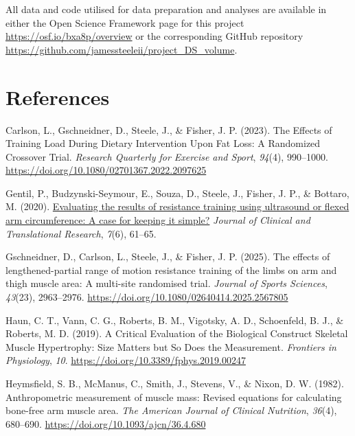 \documentclass[
]{article}
\newlength{\cslhangindent}
\newenvironment{CSLReferences}[2] %
 {\begin{list}{}{%
  \setlength{\itemindent}{0pt}
  \setlength{\leftmargin}{0pt}
  \setlength{\parsep}{0pt}
  \ifodd #1
   \setlength{\leftmargin}{\cslhangindent}
   \setlength{\itemindent}{-1\cslhangindent}
  \fi
  \setlength{\itemsep}{#2\baselineskip}}}
 {\end{list}}
\begin{document}
All data and code utilised for data preparation and analyses are
available in either the Open Science Framework page for this project
\url{https://osf.io/bxa8p/overview} or the corresponding GitHub
repository \url{https://github.com/jamessteeleii/project_DS_volume}.

\section{References}\label{references}

\label{refs}
\begin{CSLReferences}{1}{0}
Carlson, L., Gschneidner, D., Steele, J., \& Fisher, J. P. (2023). The
{Effects} of {Training Load During Dietary Intervention Upon Fat Loss}:
{A Randomized Crossover Trial}. \emph{Research Quarterly for Exercise
and Sport}, \emph{94}(4), 990--1000.
\url{https://doi.org/10.1080/02701367.2022.2097625}

Gentil, P., Budzynski-Seymour, E., Souza, D., Steele, J., Fisher, J. P.,
\& Bottaro, M. (2020).
\href{https://www.ncbi.nlm.nih.gov/pmc/articles/PMC7787222}{Evaluating
the results of resistance training using ultrasound or flexed arm
circumference: {A} case for keeping it simple?} \emph{Journal of
Clinical and Translational Research}, \emph{7}(6), 61--65.

Gschneidner, D., Carlson, L., Steele, J., \& Fisher, J. P. (2025). The
effects of lengthened-partial range of motion resistance training of the
limbs on arm and thigh muscle area: {A} multi-site randomised trial.
\emph{Journal of Sports Sciences}, \emph{43}(23), 2963--2976.
\url{https://doi.org/10.1080/02640414.2025.2567805}

Haun, C. T., Vann, C. G., Roberts, B. M., Vigotsky, A. D., Schoenfeld,
B. J., \& Roberts, M. D. (2019). A {Critical Evaluation} of the
{Biological Construct Skeletal Muscle Hypertrophy}: {Size Matters} but
{So Does} the {Measurement}. \emph{Frontiers in Physiology}, \emph{10}.
\url{https://doi.org/10.3389/fphys.2019.00247}

Heymsfield, S. B., McManus, C., Smith, J., Stevens, V., \& Nixon, D. W.
(1982). Anthropometric measurement of muscle mass: Revised equations for
calculating bone-free arm muscle area. \emph{The American Journal of
Clinical Nutrition}, \emph{36}(4), 680--690.
\url{https://doi.org/10.1093/ajcn/36.4.680}


\end{CSLReferences}
\end{document}
